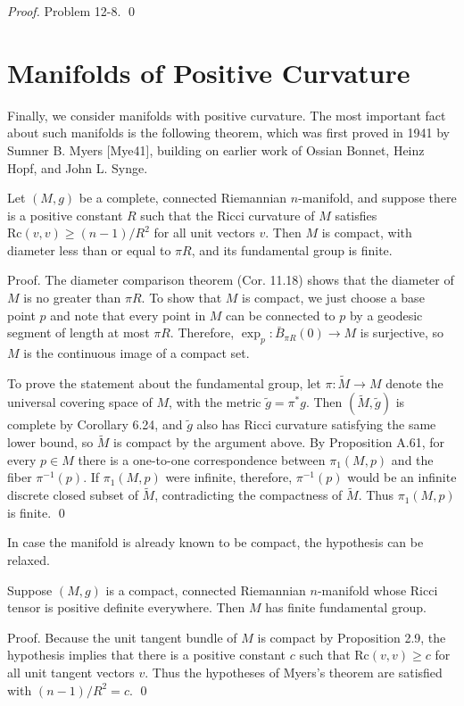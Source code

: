 \textit{Proof.} Problem 12-8. \qed

\section{Manifolds of Positive Curvature}

Finally, we consider manifolds with positive curvature. The most important fact about such manifolds is the following theorem, which was first proved in 1941 by Sumner B. Myers [Mye41], building on earlier work of Ossian Bonnet, Heinz Hopf, and John L. Synge.

\begin{theorem}[Myers]
\label{thm:myers-positive-ricci}
Let $(M,g)$ be a complete, connected Riemannian $n$-manifold, and suppose there is a positive constant $R$ such that the Ricci curvature of $M$ satisfies $\text{Rc}(v,v) \geq (n-1)/R^2$ for all unit vectors $v$. Then $M$ is compact, with diameter less than or equal to $\pi R$, and its fundamental group is finite.

Proof. The diameter comparison theorem (Cor. 11.18) shows that the diameter of $M$ is no greater than $\pi R$. To show that $M$ is compact, we just choose a base point $p$ and note that every point in $M$ can be connected to $p$ by a geodesic segment of length at most $\pi R$. Therefore, $\exp_p : \bar{B}_{\pi R}(0) \to M$ is surjective, so $M$ is the continuous image of a compact set.

To prove the statement about the fundamental group, let $\pi : \tilde{M} \to M$ denote the universal covering space of $M$, with the metric $\tilde{g} = \pi^* g$. Then $(\tilde{M}, \tilde{g})$ is complete by Corollary 6.24, and $\tilde{g}$ also has Ricci curvature satisfying the same lower bound, so $\tilde{M}$ is compact by the argument above. By Proposition A.61, for every $p \in M$ there is a one-to-one correspondence between $\pi_1(M,p)$ and the fiber $\pi^{-1}(p)$. If $\pi_1(M,p)$ were infinite, therefore, $\pi^{-1}(p)$ would be an infinite discrete closed subset of $\tilde{M}$, contradicting the compactness of $\tilde{M}$. Thus $\pi_1(M,p)$ is finite. \qed
\end{theorem}

In case the manifold is already known to be compact, the hypothesis can be relaxed.

\begin{corollary}
\label{cor:positive-ricci-finite-fundamental-group}
Suppose $(M,g)$ is a compact, connected Riemannian $n$-manifold whose Ricci tensor is positive definite everywhere. Then $M$ has finite fundamental group.

Proof. Because the unit tangent bundle of $M$ is compact by Proposition 2.9, the hypothesis implies that there is a positive constant $c$ such that $\text{Rc}(v,v) \geq c$ for all unit tangent vectors $v$. Thus the hypotheses of Myers's theorem are satisfied with $(n-1)/R^2 = c$. \qed
\end{corollary}

